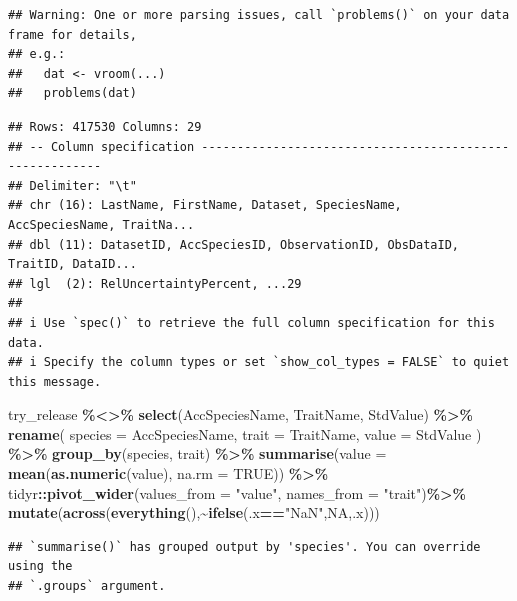 \documentclass[
  12pt,
  american,
  a4paper,
  extrafontsizes,onecolumn,openright
  ]{memoir}
\newenvironment{Shaded}{\begin{snugshade}}{\end{snugshade}}
\newcommand{\AttributeTok}[1]{\textcolor[rgb]{0.13,0.29,0.53}{#1}}
\newcommand{\ConstantTok}[1]{\textcolor[rgb]{0.56,0.35,0.01}{#1}}
\newcommand{\FunctionTok}[1]{\textcolor[rgb]{0.13,0.29,0.53}{\textbf{#1}}}
\newcommand{\NormalTok}[1]{#1}
\newcommand{\SpecialCharTok}[1]{\textcolor[rgb]{0.81,0.36,0.00}{\textbf{#1}}}
\newcommand{\StringTok}[1]{\textcolor[rgb]{0.31,0.60,0.02}{#1}}
\begin{document}
\begin{verbatim}
## Warning: One or more parsing issues, call `problems()` on your data frame for details,
## e.g.:
##   dat <- vroom(...)
##   problems(dat)
\end{verbatim}

\begin{verbatim}
## Rows: 417530 Columns: 29
## -- Column specification --------------------------------------------------------
## Delimiter: "\t"
## chr (16): LastName, FirstName, Dataset, SpeciesName, AccSpeciesName, TraitNa...
## dbl (11): DatasetID, AccSpeciesID, ObservationID, ObsDataID, TraitID, DataID...
## lgl  (2): RelUncertaintyPercent, ...29
## 
## i Use `spec()` to retrieve the full column specification for this data.
## i Specify the column types or set `show_col_types = FALSE` to quiet this message.
\end{verbatim}

\begin{Shaded}
\begin{Highlighting}[]
\NormalTok{try\_release }\SpecialCharTok{\%\textless{}\textgreater{}\%}
  \FunctionTok{select}\NormalTok{(AccSpeciesName, TraitName, StdValue) }\SpecialCharTok{\%\textgreater{}\%}
  \FunctionTok{rename}\NormalTok{(}
    \AttributeTok{species =}\NormalTok{ AccSpeciesName,}
    \AttributeTok{trait =}\NormalTok{ TraitName,}
    \AttributeTok{value =}\NormalTok{ StdValue}
\NormalTok{  ) }\SpecialCharTok{\%\textgreater{}\%}
  \FunctionTok{group\_by}\NormalTok{(species, trait) }\SpecialCharTok{\%\textgreater{}\%}
  \FunctionTok{summarise}\NormalTok{(}\AttributeTok{value =} \FunctionTok{mean}\NormalTok{(}\FunctionTok{as.numeric}\NormalTok{(value), }\AttributeTok{na.rm =} \ConstantTok{TRUE}\NormalTok{)) }\SpecialCharTok{\%\textgreater{}\%}
\NormalTok{  tidyr}\SpecialCharTok{::}\FunctionTok{pivot\_wider}\NormalTok{(}\AttributeTok{values\_from =} \StringTok{"value"}\NormalTok{, }\AttributeTok{names\_from =} \StringTok{"trait"}\NormalTok{)}\SpecialCharTok{\%\textgreater{}\%}
  \FunctionTok{mutate}\NormalTok{(}\FunctionTok{across}\NormalTok{(}\FunctionTok{everything}\NormalTok{(),}\SpecialCharTok{\textasciitilde{}}\FunctionTok{ifelse}\NormalTok{(.x}\SpecialCharTok{==}\StringTok{"NaN"}\NormalTok{,}\ConstantTok{NA}\NormalTok{,.x)))}
\end{Highlighting}
\end{Shaded}

\begin{verbatim}
## `summarise()` has grouped output by 'species'. You can override using the
## `.groups` argument.
\end{verbatim}
\end{document}
